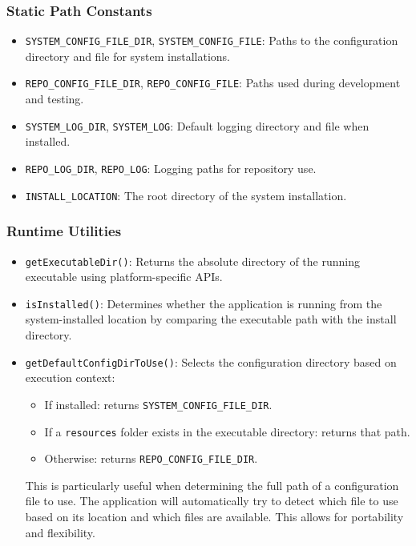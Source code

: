 \subsubsection*{Static Path Constants}
\begin{itemize}
	\item \texttt{SYSTEM\_CONFIG\_FILE\_DIR}, \texttt{SYSTEM\_CONFIG\_FILE}: Paths to the configuration directory and file for system installations.
	\item \texttt{REPO\_CONFIG\_FILE\_DIR}, \texttt{REPO\_CONFIG\_FILE}: Paths used during development and testing.
	\item \texttt{SYSTEM\_LOG\_DIR}, \texttt{SYSTEM\_LOG}: Default logging directory and file when installed.
	\item \texttt{REPO\_LOG\_DIR}, \texttt{REPO\_LOG}: Logging paths for repository use.
	\item \texttt{INSTALL\_LOCATION}: The root directory of the system installation.
\end{itemize}

\subsubsection*{Runtime Utilities} \label{sec:global-constants-utilities}
\begin{itemize}
	\item \texttt{getExecutableDir()}: Returns the absolute directory of the running executable using platform-specific APIs.
	
	\item \texttt{isInstalled()}: Determines whether the application is running from the system-installed location by comparing the executable path with the install directory.
	
	\item \texttt{getDefaultConfigDirToUse()}: Selects the configuration directory based on execution context:
	\begin{itemize}
		\item If installed: returns \texttt{SYSTEM\_CONFIG\_FILE\_DIR}.
		\item If a \texttt{resources} folder exists in the executable directory: returns that path.
		\item Otherwise: returns \texttt{REPO\_CONFIG\_FILE\_DIR}.
	\end{itemize}
	This is particularly useful when determining the full path of a configuration file to use. The application will automatically try to detect which file to use based on its location and which files are available. This allows for portability and flexibility.
\end{itemize}

